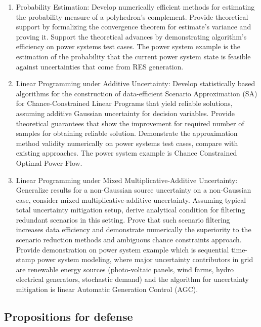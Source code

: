 \begin{enumerate}
    \item Probability Estimation: Develop numerically efficient methods for estimating the probability measure of a polyhedron's complement. Provide theoretical support by formalizing the convergence theorem for estimate's variance and proving it. Support the theoretical advances by demonstrating algorithm's efficiency on power systems test cases. The power system example is the estimation of the probability that the current power system state is feasible against uncertainties that come from RES generation.
    \item Linear Programming under Additive Uncertainty: Develop statistically based algorithms for the construction of data-efficient Scenario Approximation (SA) for Chance-Constrained Linear Programs that yield reliable solutions, assuming additive Gaussian uncertainty for decision variables. Provide theoretical guarantees that show the improvement for required number of samples for obtaining reliable solution. Demonstrate the approximation method validity numerically on power systems test cases, compare with existing approaches. The power system example is Chance Constrained Optimal Power Flow.
    \item Linear Programming under Mixed Multiplicative-Additive Uncertainty: Generalize results for a non-Gaussian source uncertainty on a non-Gaussian case, consider mixed multiplicative-additive uncertainty. Assuming typical total uncertainty mitigation setup, derive analytical condition for filtering redundant scenarios in this setting. Prove that such scenario filtering increases data efficiency and demonstrate numerically the superiority to the scenario reduction methods and ambiguous chance constraints approach. Provide demonstration on power system example which is sequential time-stamp power system modeling, where major uncertainty contributors in grid are renewable energy sources (photo-voltaic panels, wind farms, hydro electrical generators, stochastic demand) and the algorithm for uncertainty mitigation is linear Automatic Generation Control (AGC).
\end{enumerate}


\newpage

\subsection*{Propositions for defense}

